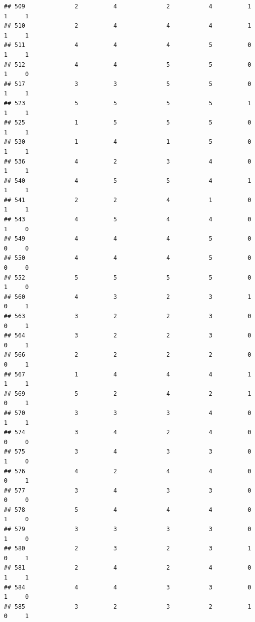 \documentclass[
]{article}
\begin{document}
\begin{verbatim}
## 509              2          4              2           4          1    1     1
## 510              2          4              4           4          1    1     1
## 511              4          4              4           5          0    1     1
## 512              4          4              5           5          0    1     0
## 517              3          3              5           5          0    1     1
## 523              5          5              5           5          1    1     1
## 525              1          5              5           5          0    1     1
## 530              1          4              1           5          0    1     1
## 536              4          2              3           4          0    1     1
## 540              4          5              5           4          1    1     1
## 541              2          2              4           1          0    1     1
## 543              4          5              4           4          0    1     0
## 549              4          4              4           5          0    0     0
## 550              4          4              4           5          0    0     0
## 552              5          5              5           5          0    1     0
## 560              4          3              2           3          1    0     1
## 563              3          2              2           3          0    0     1
## 564              3          2              2           3          0    0     1
## 566              2          2              2           2          0    0     1
## 567              1          4              4           4          1    1     1
## 569              5          2              4           2          1    0     1
## 570              3          3              3           4          0    1     1
## 574              3          4              2           4          0    0     0
## 575              3          4              3           3          0    1     0
## 576              4          2              4           4          0    0     1
## 577              3          4              3           3          0    0     0
## 578              5          4              4           4          0    1     0
## 579              3          3              3           3          0    1     0
## 580              2          3              2           3          1    0     1
## 581              2          4              2           4          0    1     1
## 584              4          4              3           3          0    1     0
## 585              3          2              3           2          1    0     1

\end{verbatim}
\end{document}
